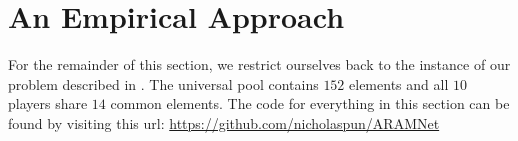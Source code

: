 \section{An Empirical Approach}\label{Section:Empirical-Approach}

For the remainder of this section, we restrict ourselves back to the instance of our problem described in .
The universal pool contains $152$ elements and all $10$ players share $14$ common elements.
The code for everything in this section can be found by visiting this url: \url{https://github.com/nicholaspun/ARAMNet}



